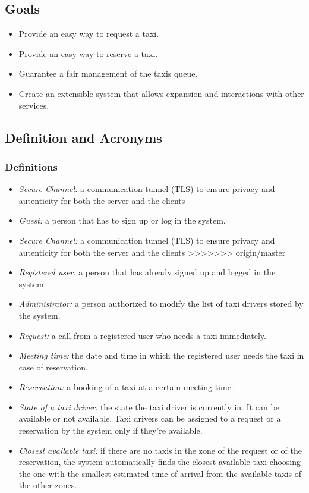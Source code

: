 \documentclass{article}
\begin{document}
\subsection{Goals}
\begin{itemize}
	\item Provide an easy way to request a taxi.
	\item Provide an easy way to reserve a taxi.
	\item Guarantee a fair management of the taxis queue.
	\item Create an extensible system that allows expansion and interactions with other services.
\end{itemize}

\subsection{Definition and Acronyms}

\subsubsection{Definitions}
\begin{itemize}
<<<<<<< HEAD
	\item \textit{Secure Channel:} a communication tunnel (TLS) to ensure privacy and autenticity for both the server and the clients %
	\item \textit{Guest:} a person that has to sign up or log in the system.
=======
	\item \textit{Secure Channel:} a communication tunnel (TLS) to ensure privacy and autenticity for both the server and the clients %
>>>>>>> origin/master
	\item \textit{Registered user:} a person that has already signed up and logged in the system.
	\item \textit{Administrator:} a person authorized to modify the list of taxi drivers stored by the system.
	\item \textit{Request:} a call from a registered user who needs a taxi immediately.
	\item \textit{Meeting time:} the date and time in which the registered user needs the taxi in case of reservation.
	\item \textit{Reservation:} a booking of a taxi at a certain meeting time.
	\item \textit{State of a taxi driver:} the state the taxi driver is currently in. It can be available or not available. Taxi drivers can be assigned to a request or a reservation by the system only if they're available.
	\item \textit{Closest available taxi:} if there are no taxis in the zone of the request or of the reservation, the system automatically finds the closest available taxi choosing the one with the smallest estimated time of arrival from the available taxis of the other zones.
\end{itemize}
\end{document}
